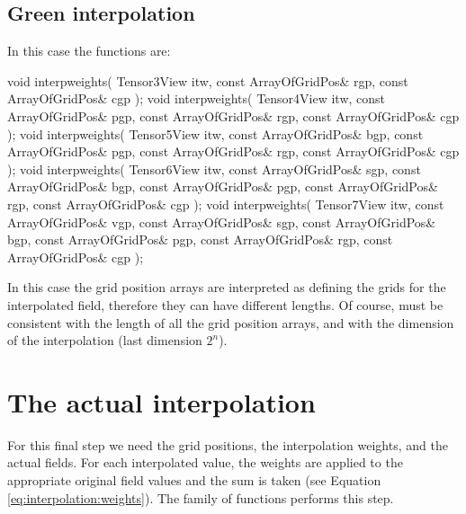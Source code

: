 \subsection{Green interpolation}

In this case the functions are:

\begin{code}
void interpweights( Tensor3View itw,
                    const ArrayOfGridPos& rgp,
                    const ArrayOfGridPos& cgp );
void interpweights( Tensor4View itw,
                    const ArrayOfGridPos& pgp,
                    const ArrayOfGridPos& rgp,
                    const ArrayOfGridPos& cgp );
void interpweights( Tensor5View itw,
                    const ArrayOfGridPos& bgp,
                    const ArrayOfGridPos& pgp,
                    const ArrayOfGridPos& rgp,
                    const ArrayOfGridPos& cgp );
void interpweights( Tensor6View itw,
                    const ArrayOfGridPos& sgp,
                    const ArrayOfGridPos& bgp,
                    const ArrayOfGridPos& pgp,
                    const ArrayOfGridPos& rgp,
                    const ArrayOfGridPos& cgp );
void interpweights( Tensor7View itw,
                    const ArrayOfGridPos& vgp,
                    const ArrayOfGridPos& sgp,
                    const ArrayOfGridPos& bgp,
                    const ArrayOfGridPos& pgp,
                    const ArrayOfGridPos& rgp,
                    const ArrayOfGridPos& cgp );
\end{code}

In this case the grid position arrays are interpreted as defining the
grids for the interpolated field, therefore they can have different
lengths. Of course,  must be consistent with the length of
all the grid position arrays, and with the dimension of the
interpolation (last dimension $2^n$).

\section{The actual interpolation}

For this final step we need the grid positions, the
interpolation weights, and the actual fields. For each interpolated
value, the weights are applied to the appropriate original field values
and the sum is taken (see Equation
\ref{eq:interpolation:weights}). The  family of functions
performs this step.

